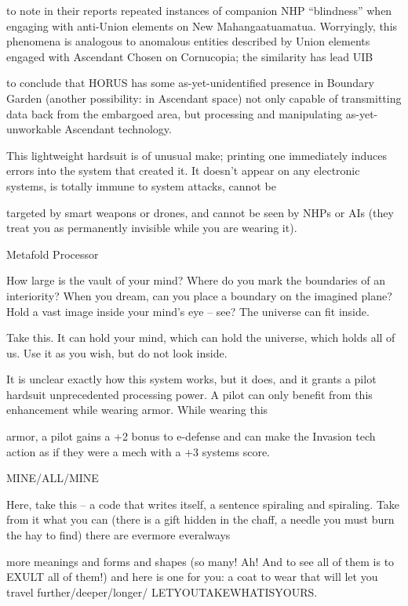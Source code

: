 to note in their reports repeated instances of companion NHP “blindness” when engaging with anti-Union  
elements on New Mahangaatuamatua. Worryingly, this phenomena is analogous to anomalous entities  
described by Union elements engaged with Ascendant Chosen on Cornucopia; the similarity has lead UIB  

to conclude that HORUS has some as-yet-unidentified presence in Boundary Garden (another possibility:  
in Ascendant space) not only capable of transmitting data back from the embargoed area, but processing  
and manipulating as-yet-unworkable Ascendant technology.     

This lightweight hardsuit is of unusual make; printing one immediately induces errors into the system that  
created it. It doesn’t appear on any electronic systems, is totally immune to system attacks, cannot be  

targeted by smart weapons or drones, and cannot be seen by NHPs or AIs (they treat you as permanently  
invisible while you are wearing it).
 

Metafold Processor  

                                                                                                                 


How large is the vault of your mind? Where do you mark the boundaries of an interiority? When you dream,  
can you place a boundary on the imagined plane? Hold a vast image inside your mind’s eye -- see? The  
universe can fit inside.  

Take this. It can hold your mind, which can hold the universe, which holds all of us. Use it as you wish, but  
do not look inside.   

It is unclear exactly how this system works, but it does, and it grants a pilot hardsuit unprecedented  
processing power. A pilot can only benefit from this enhancement while wearing armor. While wearing this  

armor, a pilot gains a +2 bonus to e-defense and can make the Invasion tech action as if they were a mech  
with a +3 systems score.
 

MINE/ALL/MINE
 
Here, take this -- a code that writes itself, a sentence spiraling and spiraling. Take from it what you can  
(there is a gift hidden in the chaff, a needle you must burn the hay to find) there are evermore everalways  

more meanings and forms and shapes (so many! Ah! And to see all of them is to EXULT all of them!) and  
here is one for you: a coat to wear that will let you travel further/deeper/longer/ 
LETYOUTAKEWHATISYOURS.  

